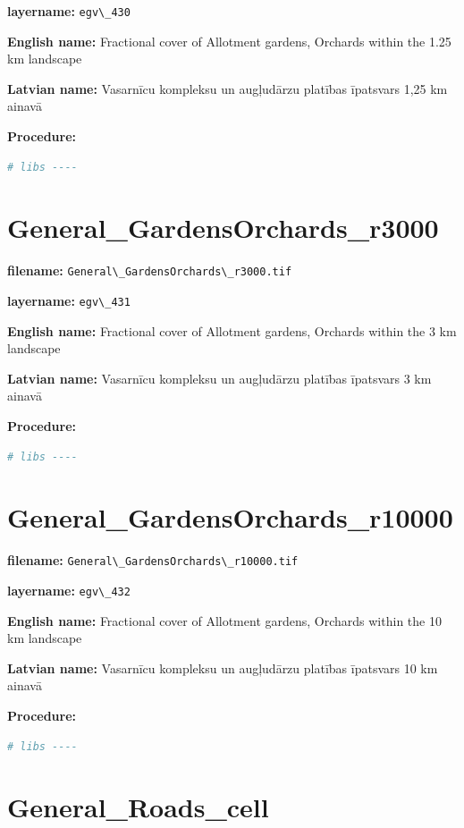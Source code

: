 \documentclass[
]{book}
\newcommand{\passthrough}[1]{#1}
\begin{document}
\textbf{layername:} \passthrough{\lstinline!egv\_430!}

\textbf{English name:} Fractional cover of Allotment gardens, Orchards within the 1.25 km landscape

\textbf{Latvian name:} Vasarnīcu kompleksu un augļudārzu platības īpatsvars 1,25 km ainavā

\textbf{Procedure:}

\begin{lstlisting}[language=R]
# libs ----
\end{lstlisting}

\section{General\_GardensOrchards\_r3000}\label{ch06.431}

\textbf{filename:} \passthrough{\lstinline!General\_GardensOrchards\_r3000.tif!}

\textbf{layername:} \passthrough{\lstinline!egv\_431!}

\textbf{English name:} Fractional cover of Allotment gardens, Orchards within the 3 km landscape

\textbf{Latvian name:} Vasarnīcu kompleksu un augļudārzu platības īpatsvars 3 km ainavā

\textbf{Procedure:}

\begin{lstlisting}[language=R]
# libs ----
\end{lstlisting}

\section{General\_GardensOrchards\_r10000}\label{ch06.432}

\textbf{filename:} \passthrough{\lstinline!General\_GardensOrchards\_r10000.tif!}

\textbf{layername:} \passthrough{\lstinline!egv\_432!}

\textbf{English name:} Fractional cover of Allotment gardens, Orchards within the 10 km landscape

\textbf{Latvian name:} Vasarnīcu kompleksu un augļudārzu platības īpatsvars 10 km ainavā

\textbf{Procedure:}

\begin{lstlisting}[language=R]
# libs ----
\end{lstlisting}

\section{General\_Roads\_cell}\label{ch06.433}
\end{document}
